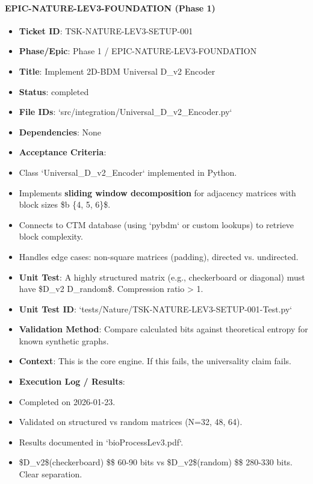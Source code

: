 \documentclass{article}
\begin{document}
\paragraph{EPIC-NATURE-LEV3-FOUNDATION (Phase 1)}

\begin{itemize}
\item   \textbf{Ticket ID}: TSK-NATURE-LEV3-SETUP-001
\item   \textbf{Phase/Epic}: Phase 1 / EPIC-NATURE-LEV3-FOUNDATION
\item   \textbf{Title}: Implement 2D-BDM Universal D\_v2 Encoder
\item   \textbf{Status}: completed
\item   \textbf{File IDs}: `src/integration/Universal\_D\_v2\_Encoder.py`
\item   \textbf{Dependencies}: None
\item   \textbf{Acceptance Criteria}:
\item   Class `Universal\_D\_v2\_Encoder` implemented in Python.
\item   Implements \textbf{sliding window decomposition} for adjacency matrices with block sizes \$b \in \{4, 5, 6\}\$.
\item   Connects to CTM database (using `pybdm` or custom lookups) to retrieve block complexity.
\item   Handles edge cases: non-square matrices (padding), directed vs. undirected.
\item   \textbf{Unit Test}: A highly structured matrix (e.g., checkerboard or diagonal) must have \$D\_{v2} \ll D\_{random}\$. Compression ratio > 1.
\item   \textbf{Unit Test ID}: `tests/Nature/TSK-NATURE-LEV3-SETUP-001-Test.py`
\item   \textbf{Validation Method}: Compare calculated bits against theoretical entropy for known synthetic graphs.
\item   \textbf{Context}: This is the core engine. If this fails, the universality claim fails.
\item   \textbf{Execution Log / Results}:
\item   Completed on 2026-01-23.
\item   Validated on structured vs random matrices (N=32, 48, 64).
\item   Results documented in `bioProcessLev3.pdf`.
\item   \$D\_{v2}\$(checkerboard) \$\approx\$ 60-90 bits vs \$D\_{v2}\$(random) \$\approx\$ 280-330 bits. Clear separation.
\end{itemize}
\end{document}
